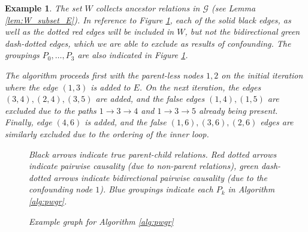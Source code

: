 \documentclass{statsoc}
\def\gcg{\mathcal{G}}  %
\newtheorem{example}{Example}
\begin{document}
\begin{example}
  The set $W$ collects ancestor relations in $\gcg$ (see Lemma
  \ref{lem:W_subset_E}).  In reference to Figure
  \ref{fig:example_fig3}, each of the solid black edges, as well as
  the dotted red edges will be included in $W$, but \textit{not} the
  bidirectional green dash-dotted edges, which we are able to exclude
  as results of confounding.  The groupings $P_0, \ldots, P_3$ are also
  indicated in Figure \ref{fig:example_fig3}.

  The algorithm proceeds first with the parent-less nodes $1, 2$ on the
  initial iteration where the edge $(1, 3)$ is added to $E$.  On the
  next iteration, the edges $(3, 4), (2, 4), (3, 5)$ are added, and
  the false edges $(1, 4), (1, 5)$ are excluded due to the paths
  $1 \rightarrow 3 \rightarrow 4$ and $1 \rightarrow 3 \rightarrow 5$
  already being present.  Finally, edge $(4, 6)$ is added, and the false
  $(1, 6), (3, 6), (2, 6)$ edges are similarly excluded due to the
  ordering of the inner loop.
  
  \begin{figure}
    \centering
    \caption{Example graph for Algorithm \ref{alg:pwgr}}
    {\footnotesize{Black arrows indicate true parent-child
        relations.  Red dotted arrows indicate pairwise causality (due to
        non-parent relations), green dash-dotted arrows indicate
        bidirectional pairwise causality (due to the confounding node
        $1$).  Blue groupings indicate each $P_k$ in Algorithm
        \ref{alg:pwgr}.}}
    \label{fig:example_fig3}
    

\end{figure}
\end{example}
\end{document}
